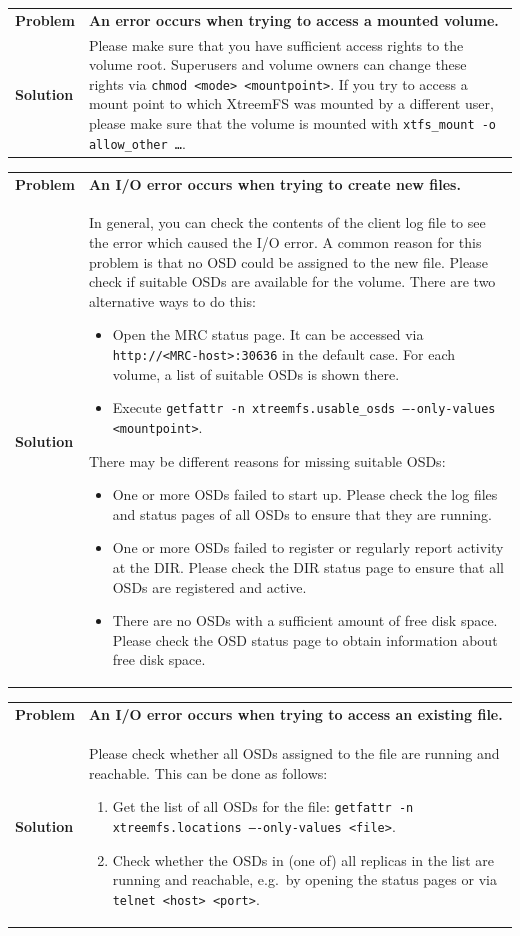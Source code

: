 \documentclass[a4paper,10pt]{book}
\begin{document}
\begin{tabular}{lp{10cm}}
 \textbf{Problem}  & \textbf{An error occurs when trying to access a mounted volume.} \\
 \textbf{Solution} & Please make sure that you have sufficient access rights to the volume root. Superusers and volume owners can change these rights via \texttt{chmod <mode> <mountpoint>}. If you try to access a mount point to which XtreemFS was mounted by a different user, please make sure that the volume is mounted with \texttt{xtfs\_mount -o allow\_other \dots}.
\end{tabular}

\begin{tabular}{lp{10cm}}
 \textbf{Problem}  & \textbf{An I/O error occurs when trying to create new files.} \\
 \textbf{Solution} & In general, you can check the contents of the client log file to see the error which caused the I/O error. A common reason for this problem is that no OSD could be assigned to the new file. Please check if suitable OSDs are available for the volume. There are two alternative ways to do this:
   \begin{itemize}
     \item Open the MRC status page. It can be accessed via \texttt{http://<MRC-host>:30636} in the default case. For each volume, a list of suitable OSDs is shown there.
     \item Execute \texttt{getfattr -n xtreemfs.usable\_osds ----only-values <mountpoint>}.
   \end{itemize}
 There may be different reasons for missing suitable OSDs:
   \begin{itemize}
    \item One or more OSDs failed to start up. Please check the log files and status pages of all OSDs to ensure that they are running.
    \item One or more OSDs failed to register or regularly report activity at the DIR. Please check the DIR status page to ensure that all OSDs are registered and active.
    \item There are no OSDs with a sufficient amount of free disk space. Please check the OSD status page to obtain information about free disk space.
   \end{itemize}
\end{tabular}

\begin{tabular}{lp{10cm}}
 \textbf{Problem}  & \textbf{An I/O error occurs when trying to access an existing file.}\\
 \textbf{Solution} & Please check whether all OSDs assigned to the file are running and reachable. This can be done as follows:
    \begin{enumerate}
     \item Get the list of all OSDs for the file: \texttt{getfattr -n xtreemfs.locations ----only-values <file>}.
     \item Check whether the OSDs in (one of) all replicas in the list are running and reachable, e.g.\ by opening the status pages or via \texttt{telnet <host> <port>}.
    \end{enumerate}
\end{tabular}
\end{document}
